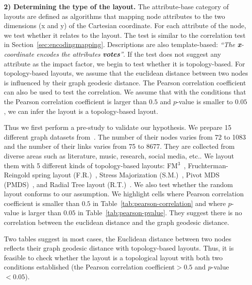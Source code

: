 \textbf{2) Determining the type of the layout.} 
The attribute-base category of layouts are defined as algorithms that mapping node attributes to the two dimensions (x and y) of the Cartesian coordinate. 
For each attribute of the node, we test whether it relates to the layout.
The test is similar to the correlation test in Section~\ref{sec:encodingmapping}.
Descriptions are also template-based: \textit{``The \textbf{\color{text-highlight}x}-coordinate encodes the attributes \textbf{\color{text-highlight}votes}''}.
If the test does not suggest any attribute as the impact factor, we begin to test whether it is topology-based.
For topology-based layouts, we assume that the euclidean distance between two nodes is influenced by their graph geodesic distance.
The Pearson correlation coefficient can also be used to test the correlation.
We assume that with the conditions that the Pearson correlation coefficient is larger than $0.5$ and $p$-value is smaller to $0.05$, we can infer the layout is a topology-based layout.

Thus we first perform a pre-study to validate our hypothesis.
We prepare 15 different graph datasets from~\cite{DBLP:journals/tvcg/ZhuCHHLZ21}.
The number of their nodes varies from 72 to 1083 and the number of their links varies from 75 to 8677.
They are collected from diverse areas such as literature, music, research, social media, etc..
We layout them with 5 different kinds of topology-based layouts: FM$^3$~\cite{hachul2004drawing}, Fruchterman-Reingold spring layout (F.R.)~\cite{DBLP:journals/spe/FruchtermanR91}, Stress Majorization (S.M.)~\cite{DBLP:conf/gd/GansnerKN04
}, Pivot MDS (PMDS)~\cite{DBLP:conf/gd/BrandesP06}, and Radial Tree layout (R.T.)~\cite{DBLP:conf/infovis/Jankun-KellyM03}.
We also test whether the random layout conforms to our assumption.
We highlight cells where Pearson correlation coefficient is smaller than $0.5$ in Table~\ref{tab:pearson-correlation} and where $p$-value is larger than $0.05$ in Table~\ref{tab:pearson-pvalue}.
They suggest there is no correlation between the euclidean distance and the graph geodesic distance.

Two tables suggest in most cases, the Euclidean distance between two nodes reflects their graph geodesic distance with topology-based layouts.
Thus, it is feasible to check whether the layout is a topological layout with both two conditions established (the Pearson correlation coefficient$>0.5$ and $p$-value$<0.05$).


